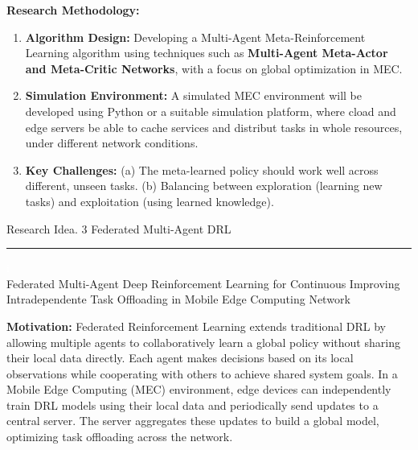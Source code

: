 \documentclass[12pt]{article}
\begin{document}
\vspace{5mm}

\noindent\textbf{\large Research Methodology:}

\begin{enumerate}  \item \textbf{Algorithm Design:} Developing a Multi-Agent Meta-Reinforcement Learning algorithm using techniques such as \textbf{Multi-Agent Meta-Actor and Meta-Critic Networks}, with a focus on global optimization in MEC.\vspace{-1mm}

\item \textbf{Simulation Environment:} A simulated MEC environment will be developed using Python or a suitable simulation platform, where cload and edge servers be able to cache services and distribut tasks in whole resources, under different network conditions. 
	
\item \textbf{Key Challenges:}  (a) The meta-learned policy should work well across different, unseen tasks. (b) Balancing between exploration (learning new tasks) and exploitation (using learned knowledge). 
\end{enumerate}


\newpage



\begin{center} 
	
	
	\vspace{-17mm}
	
	\large Research Idea. 3  \hfill Federated Multi-Agent DRL \vspace{1mm} \hrule
	
	\vspace{-1mm}
	
	
	
	
	\textcolor{white}{i} \\ \LARGE Federated Multi-Agent Deep Reinforcement Learning for Continuous Improving Intradependente Task Offloading in Mobile Edge Computing Network\vspace{6mm}\\
	
\end{center}
\vspace{-5mm}

\noindent\textbf{\large Motivation:  } 
Federated Reinforcement Learning extends traditional DRL by allowing multiple agents to collaboratively learn a global policy without sharing their local data directly. Each agent makes decisions based on its local observations while cooperating with others to achieve shared system goals. In a Mobile Edge Computing (MEC) environment, edge devices can independently train DRL models using their local data and periodically send updates to a central server. The server aggregates these updates to build a global model, optimizing task offloading across the network.
\end{document}
